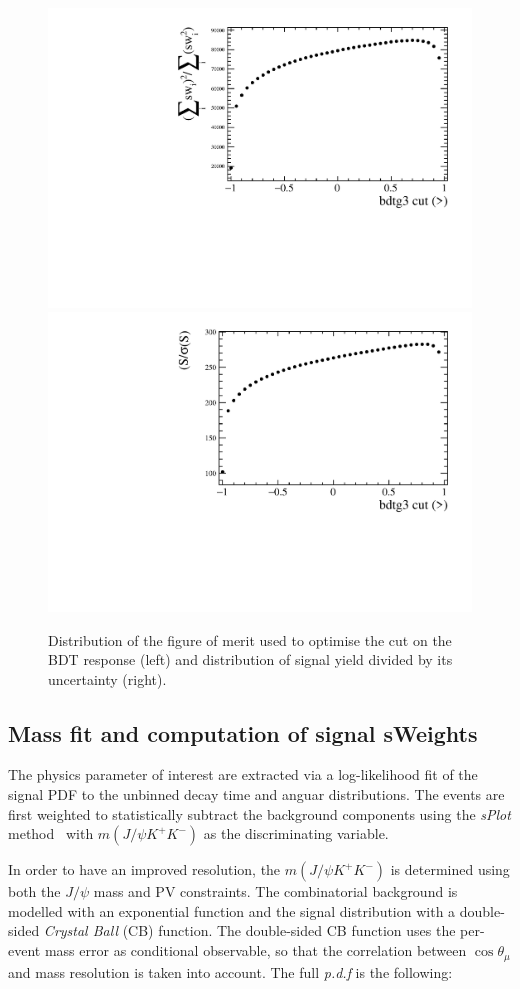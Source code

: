 \begin{figure}[t]
	\begin{center}
    \includegraphics[width=0.49\linewidth]{figs/bs_2016_FOM}
		\includegraphics[width=0.49\linewidth]{figs/bs_2016_S_SIGMAS}
	\end{center}
	\caption{\label{fig:FOM}\small
		Distribution of the figure of merit used to optimise the cut on the BDT response (left) and distribution of signal yield divided by its uncertainty (right).}
\end{figure}

\subsection{Mass fit and computation of signal sWeights}
\label{subsec:MassFit}
The physics parameter of interest are extracted via a log-likelihood fit of the signal PDF to the unbinned decay time and anguar distributions. The events are first weighted to statistically subtract the background components using the \textit{sPlot} method~\cite{sWeights} with $m(J/\psi K^+ K^-)$ as the discriminating variable. 

In order to have an improved resolution, the $m(J/\psi K^+ K^-)$ is determined using both the $J/\psi$ mass and PV constraints. The combinatorial background is modelled with an exponential function and the signal distribution with a double-sided \textit{Crystal Ball} (CB) function. The double-sided CB function uses the per-event mass error as conditional observable, so that the correlation between $\cos{\theta_{\mu}}$ and mass resolution is taken into account. The full \textit{p.d.f} is the following: 

